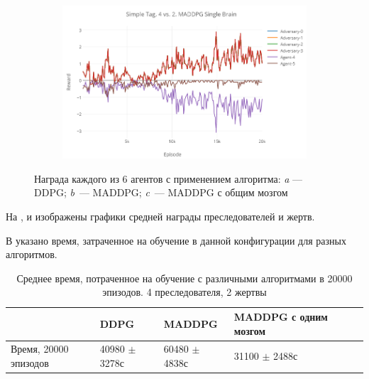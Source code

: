 \begin{figure}[!htbp]
    \begin{subfigure}[t]{\dimexpr.5\linewidth-1.3em\relax}%
        \includegraphics[height=0.20\textheight,valign=t]{my_folder/images/ch5/st-4vs2-maddpg-sb.png}%
    \end{subfigure}
    \captionsetup{justification=centering} %
    \caption{Награда каждого из 6 агентов с применением алгоритма: {\itshape a} --- DDPG; {\itshape b}~--- MADDPG; {\itshape c}~--- MADDPG с общим мозгом}\label{fig:spbpu_main_bld-two-photos}
\end{figure}

На ,  и  изображены графики средней награды преследователей и жертв.

В  указано время, затраченное на обучение в данной конфигурации для разных алгоритмов.

\begin{table}[t!]
    \centering\small
    \caption{Среднее время, потраченное на обучение с различными алгоритмами в 20000 эпизодов. 4 преследователя, 2 жертвы}
    \label{tab-st-4vs2-time}
    \begin{tabular}{|l|l|l|l|l|l|}
        \hline
        & DDPG        & MADDPG      & MADDPG с одним мозгом \\
        \hline
        Время, 20000 эпизодов & 40980 $\pm$ 3278с & 60480 $\pm$ 4838с & 31100 $\pm$ 2488с \\ \hline
    \end{tabular}
    \normalsize%
\end{table}

